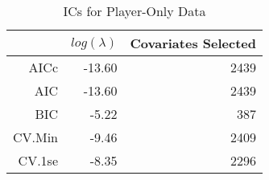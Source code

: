 \begin{table}[ht]
\centering
\begin{tabular}{rrr}
  \hline
 & $log(\lambda)$ & Covariates Selected \\ 
  \hline
AICc & -13.60 & 2439 \\ 
  AIC & -13.60 & 2439 \\ 
  BIC & -5.22 & 387 \\ 
  CV.Min & -9.46 & 2409 \\ 
  CV.1se & -8.35 & 2296 \\ 
   \hline
\end{tabular}
\caption{ICs for Player-Only Data} 
\label{tab:pl_ic}
\end{table}
